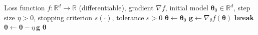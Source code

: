 \begin{minipage}{0.5\textwidth}
\begin{algorithm}[H]
\caption{Weight Space Unlearning}
\label{alg:wsu}
\begin{algorithmic}[1]
\Require Loss function $f:\mathbb{R}^d\!\to\!\mathbb{R}$ (differentiable), gradient $\nabla f$, initial model $\mathbf{\theta}_0 \in \mathbb{R}^d$, step size $\eta>0$, stopping criterion $s(\cdot)$, tolerance $\varepsilon>0$
\State $\bm{\theta} \gets \bm{\theta}_0$
    \State $\mathbf{g} \gets \nabla_\theta f(\mathbf{\theta})$ 
        \State \textbf{break} 
    \EndIf
    \State $\bm{\theta} \gets \bm\theta - \eta\, \mathbf{g}$ 
\EndWhile
\State \Return $\bm{\theta}$
\end{algorithmic}
\end{algorithm}
\end{minipage}
